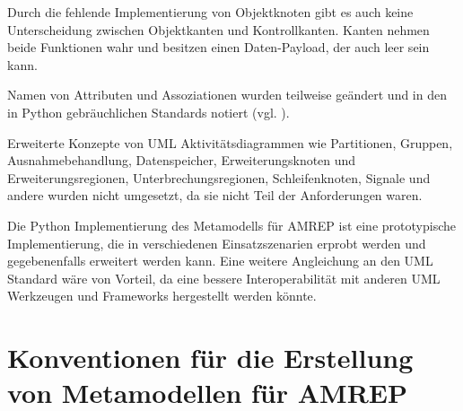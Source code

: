 Durch die fehlende Implementierung von Objektknoten gibt es auch keine Unterscheidung zwischen Objektkanten und Kontrollkanten. Kanten nehmen beide Funktionen wahr und besitzen einen Daten-Payload, der auch leer sein kann.

Namen von Attributen und Assoziationen wurden teilweise geändert und in den in Python gebräuchlichen Standards notiert (vgl. \citep{PEP8}).

Erweiterte Konzepte von UML Aktivitätsdiagrammen wie Partitionen, Gruppen, Ausnahmebehandlung, Datenspeicher, Erweiterungsknoten und Erweiterungsregionen, Unterbrechungsregionen, Schleifenknoten, Signale und andere wurden nicht umgesetzt, da sie nicht Teil der Anforderungen waren.

Die Python Implementierung des Metamodells für AMREP ist eine prototypische Implementierung, die in verschiedenen Einsatzszenarien erprobt werden und gegebenenfalls erweitert werden kann. Eine weitere Angleichung an den UML Standard wäre von Vorteil, da eine bessere Interoperabilität mit anderen UML Werkzeugen und Frameworks hergestellt werden könnte.


\section{Konventionen für die Erstellung von Metamodellen für AMREP}\label{amrep-metamodel-konv}

